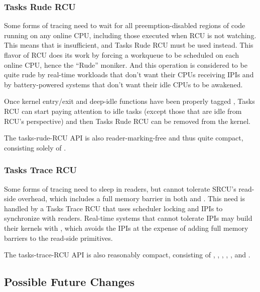 \subsubsection{Tasks Rude RCU}

Some forms of tracing need to wait for all preemption-disabled regions
of code running on any online CPU, including those executed when RCU is
not watching.
This means that  is insufficient, and
Tasks Rude RCU must be used instead.
This flavor of RCU does its work by
forcing a workqueue to be scheduled on each online CPU, hence the ``Rude''
moniker.
And this operation is considered to be quite rude by real-time
workloads that don't want their  CPUs receiving IPIs and
by battery-powered systems that don't want their idle CPUs to be awakened.

Once kernel entry/exit and deep-idle functions have been properly tagged
, Tasks RCU can start paying attention to idle tasks (except
those that are idle from RCU's perspective) and then Tasks Rude RCU can
be removed from the kernel.

The tasks-rude-RCU API is also reader-marking-free and thus quite compact,
consisting solely of .


\subsubsection{Tasks Trace RCU}

Some forms of tracing need to sleep in readers, but cannot tolerate
SRCU's read-side overhead, which includes a full memory barrier in both
 and .
This need is handled by a
Tasks Trace RCU that uses scheduler locking and IPIs to synchronize with
readers.
Real-time systems that cannot tolerate IPIs may build their
kernels with , which avoids the IPIs at
the expense of adding full memory barriers to the read-side primitives.

The tasks-trace-RCU API is also reasonably compact,
consisting of , ,
, ,
, and .


\subsection{Possible Future Changes}

